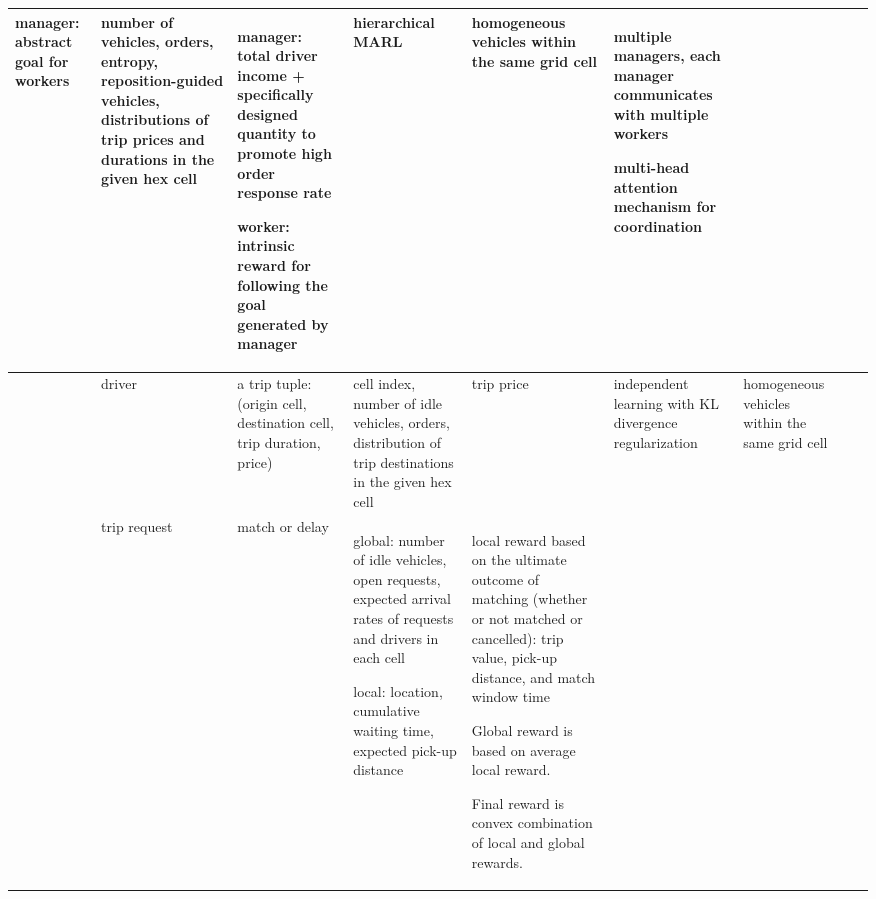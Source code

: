 \documentclass{article}
\begin{document}
\begin{table}
\begin{tabular}{||p{}|p{}|p{}|p{}|p{}|p{}|p{}|p{}|p{}||}
manager: abstract goal for workers & number of vehicles, orders, entropy, reposition-guided vehicles, distributions of trip prices and durations in the given hex cell & manager: total driver income + specifically designed quantity to promote high order response rate

worker: intrinsic reward for following the goal generated by manager & hierarchical MARL & homogeneous vehicles within the same grid cell & multiple managers, each manager communicates with multiple workers

multi-head attention mechanism for coordination \\
\hline
\cite{zhou2019multi} & driver & a trip tuple: (origin cell, destination cell, trip duration, price) & cell index, number of idle vehicles, orders, distribution of trip destinations in the given hex cell & trip price & independent learning with KL divergence regularization & homogeneous vehicles within the same grid cell & \\
\hline
\cite{ke2020learning} & trip request & match or delay & global: number of idle vehicles, open requests, expected arrival rates of requests and drivers in each cell

local: location, cumulative waiting time, expected pick-up distance & local reward based on the ultimate outcome of matching (whether or not matched or cancelled): trip value, pick-up distance, and match window time

Global reward is based on average local reward.

Final reward is convex combination of local and global rewards.


\end{tabular}
\end{table}
\end{document}
